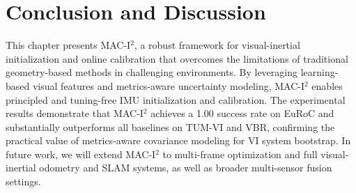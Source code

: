 % 
\section{Conclusion and Discussion}
\label{sec:maci2:conclusion}

This chapter presents MAC-I$^2$, a robust framework for visual-inertial initialization and online calibration that overcomes the limitations of traditional geometry-based methods in challenging environments. By leveraging learning-based visual features and metrics-aware uncertainty modeling, MAC-I$^2$ enables principled and tuning-free IMU initialization and calibration. The experimental results demonstrate that MAC-I$^2$ achieves a 1.00 success rate on EuRoC and substantially outperforms all baselines on TUM-VI and VBR, confirming the practical value of metrics-aware covariance modeling for VI system bootstrap. In future work, we will extend MAC-I$^2$ to multi-frame optimization and full visual-inertial odometry and SLAM systems, as well as broader multi-sensor fusion settings.
